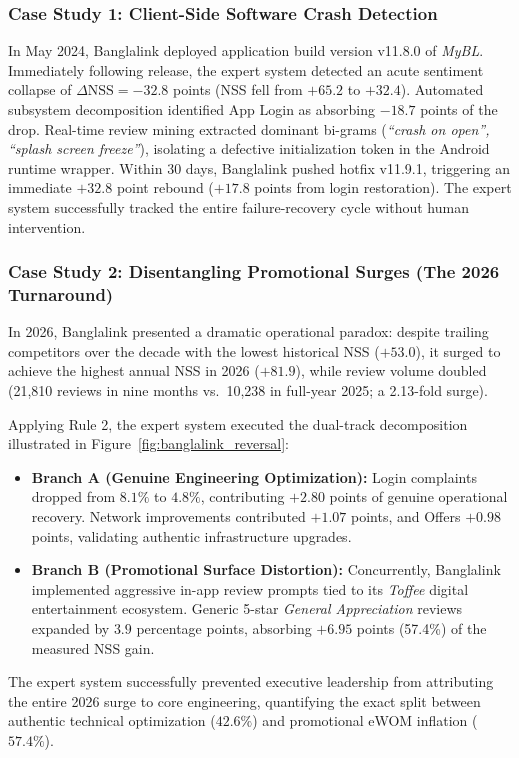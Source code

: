 \documentclass[review,12pt,authoryear]{elsarticle}
\begin{document}
\subsubsection{Case Study 1: Client-Side Software Crash Detection}
In May 2024, Banglalink deployed application build version v11.8.0 of \textit{MyBL}. Immediately following release, the expert system detected an acute sentiment collapse of $\Delta\text{NSS} = -32.8$ points (NSS fell from $+65.2$ to $+32.4$). Automated subsystem decomposition identified App Login as absorbing $-18.7$ points of the drop. Real-time review mining extracted dominant bi-grams (\textit{``crash on open'', ``splash screen freeze''}), isolating a defective initialization token in the Android runtime wrapper. Within 30 days, Banglalink pushed hotfix v11.9.1, triggering an immediate $+32.8$ point rebound ($+17.8$ points from login restoration). The expert system successfully tracked the entire failure-recovery cycle without human intervention.

\subsubsection{Case Study 2: Disentangling Promotional Surges (The 2026 Turnaround)}
In 2026, Banglalink presented a dramatic operational paradox: despite trailing competitors over the decade with the lowest historical NSS ($+53.0$), it surged to achieve the highest annual NSS in 2026 ($+81.9$), while review volume doubled (21,810 reviews in nine months vs.\ 10,238 in full-year 2025; a 2.13-fold surge).

Applying Rule 2, the expert system executed the dual-track decomposition illustrated in Figure~\ref{fig:banglalink_reversal}:
\begin{itemize}
    \item \textbf{Branch A (Genuine Engineering Optimization):} Login complaints dropped from $8.1\%$ to $4.8\%$, contributing $+2.80$ points of genuine operational recovery. Network improvements contributed $+1.07$ points, and Offers $+0.98$ points, validating authentic infrastructure upgrades.
    \item \textbf{Branch B (Promotional Surface Distortion):} Concurrently, Banglalink implemented aggressive in-app review prompts tied to its \textit{Toffee} digital entertainment ecosystem. Generic 5-star \textit{General Appreciation} reviews expanded by $3.9$ percentage points, absorbing $+6.95$ points (57.4\%) of the measured NSS gain.
\end{itemize}
The expert system successfully prevented executive leadership from attributing the entire 2026 surge to core engineering, quantifying the exact split between authentic technical optimization ($42.6\%$) and promotional eWOM inflation ($57.4\%$).
\end{document}
